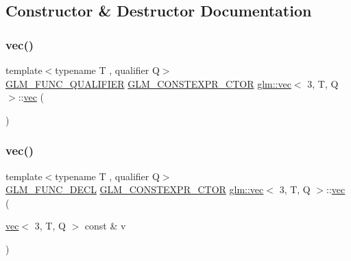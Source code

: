 \subsection{Constructor \& Destructor Documentation}
\mbox{\label{structglm_1_1vec_3_013_00_01_t_00_01_q_01_4_af6f5237c5ef6d93d6125989b4657b3cc}} 
\subsubsection{\texorpdfstring{vec()}{vec()}\hspace{0.1cm}{\footnotesize\ttfamily [1/23]}}
{\footnotesize\ttfamily template$<$typename T , qualifier Q$>$ \\
\hyperlink{setup_8hpp_a33fdea6f91c5f834105f7415e2a64407}{G\+L\+M\+\_\+\+F\+U\+N\+C\+\_\+\+Q\+U\+A\+L\+I\+F\+I\+ER} \hyperlink{setup_8hpp_ad34178a09666081abdb573c14d1f4a5a}{G\+L\+M\+\_\+\+C\+O\+N\+S\+T\+E\+X\+P\+R\+\_\+\+C\+T\+OR} \hyperlink{structglm_1_1vec}{glm\+::vec}$<$ 3, T, Q $>$\+::\hyperlink{structglm_1_1vec}{vec} (\begin{DoxyParamCaption}{ }\end{DoxyParamCaption})}

\mbox{\label{structglm_1_1vec_3_013_00_01_t_00_01_q_01_4_ae7088be55070909fe11da6bead3679f9}} 
\subsubsection{\texorpdfstring{vec()}{vec()}\hspace{0.1cm}{\footnotesize\ttfamily [2/23]}}
{\footnotesize\ttfamily template$<$typename T , qualifier Q$>$ \\
\hyperlink{setup_8hpp_ab2d052de21a70539923e9bcbf6e83a51}{G\+L\+M\+\_\+\+F\+U\+N\+C\+\_\+\+D\+E\+CL} \hyperlink{setup_8hpp_ad34178a09666081abdb573c14d1f4a5a}{G\+L\+M\+\_\+\+C\+O\+N\+S\+T\+E\+X\+P\+R\+\_\+\+C\+T\+OR} \hyperlink{structglm_1_1vec}{glm\+::vec}$<$ 3, T, Q $>$\+::\hyperlink{structglm_1_1vec}{vec} (\begin{DoxyParamCaption}\item[{\hyperlink{structglm_1_1vec}{vec}$<$ 3, T, Q $>$ const \&}]{v }\end{DoxyParamCaption})}


